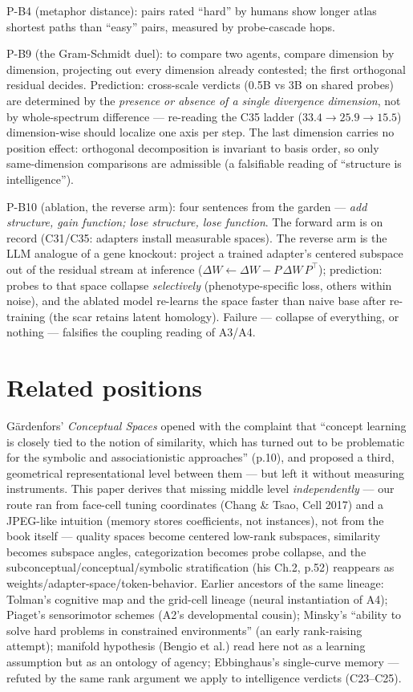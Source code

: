 \documentclass[11pt]{article}
\begin{document}
P-B4 (metaphor distance): pairs rated ``hard'' by humans show longer atlas shortest
paths than ``easy'' pairs, measured by probe-cascade hops.

P-B9 (the Gram-Schmidt duel): to compare two agents, compare dimension by
dimension, projecting out every dimension already contested; the first
orthogonal residual decides. Prediction: cross-scale verdicts (0.5B vs 3B on
shared probes) are determined by the \emph{presence or absence of a single
divergence dimension}, not by whole-spectrum difference --- re-reading the
C35 ladder ($33.4\to25.9\to15.5$) dimension-wise should localize one axis per
step. The last dimension carries no position effect: orthogonal decomposition
is invariant to basis order, so only same-dimension comparisons are admissible
(a falsifiable reading of ``structure is intelligence'').

P-B10 (ablation, the reverse arm): four sentences from the garden --- \emph{add
structure, gain function; lose structure, lose function}. The forward arm is
on record (C31/C35: adapters install measurable spaces). The reverse arm is
the LLM analogue of a gene knockout: project a trained adapter's centered
subspace out of the residual stream at inference
($\Delta W \leftarrow \Delta W - P\,\Delta W\,P^{\top}$); prediction: probes
to that space collapse \emph{selectively} (phenotype-specific loss, others
within noise), and the ablated model re-learns the space faster than naive
base after re-training (the scar retains latent homology). Failure ---
collapse of everything, or nothing --- falsifies the coupling reading of
A3/A4.

\section{Related positions}
G\"ardenfors' \emph{Conceptual Spaces} \cite{gardenfors} opened with the complaint that
``concept learning is closely tied to the notion of similarity, which has turned
out to be problematic for the symbolic and associationistic approaches'' (p.10),
and proposed a third, geometrical representational level between them --- but
left it without measuring instruments. This paper derives that missing middle
level \emph{independently} --- our route ran from face-cell tuning coordinates
(Chang \& Tsao, Cell 2017) and a JPEG-like intuition (memory stores
coefficients, not instances), not from the book itself --- quality spaces become centered low-rank
subspaces, similarity becomes subspace angles, categorization becomes probe
collapse, and the subconceptual/conceptual/symbolic stratification (his Ch.2,
p.52) reappears as weights/adapter-space/token-behavior. Earlier ancestors of
the same lineage: Tolman's cognitive map and the grid-cell lineage (neural
instantiation of A4);
Piaget's sensorimotor schemes (A2's developmental cousin); Minsky's
``ability to solve hard problems in constrained environments'' (an early
rank-raising attempt); manifold hypothesis (Bengio et al.) read here not as a
learning assumption but as an ontology of agency; Ebbinghaus's single-curve memory
--- refuted by the same rank argument we apply to intelligence verdicts (C23--C25).
\end{document}
